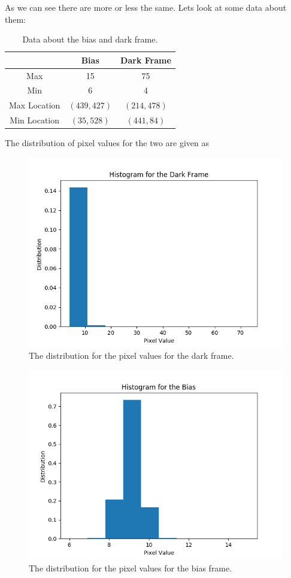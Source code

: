 \documentclass{emulateapj}
\begin{document}
As we can see there are more or less the same. Lets look at some data about them:

\begin{table}[H]
\centering
\begin{tabular}{c|c|c}
 & Bias & Dark Frame \\
 \hline
 Max & 15 & 75 \\
 Min &6 & 4\\
 Max Location & $(439, 427)$ & $(214, 478)$\\
 Min Location & $(35, 528)$ & $(441, 84)$
\end{tabular}
\caption{Data about the bias and dark frame.}
\end{table}

The distribution of pixel values for the two are given as

\begin{figure}[H]
\centering
\includegraphics[scale=0.4]{histDark.png}
\caption{The distribution for the pixel values for the dark frame.}
\label{img:darkHist}
\end{figure}


\begin{figure}[H]
\centering
\includegraphics[scale=0.4]{histBias.png}
\caption{The distribution for the pixel values for the bias frame.}
\label{img:biasHist}
\end{figure}
\end{document}
